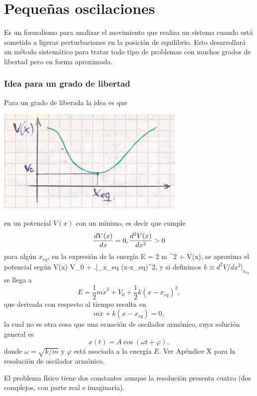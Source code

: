 \documentclass[10pt,oneside]{CBFT_book}
\begin{document}
\chapter{Pequeñas oscilaciones}

Es un formalismo para analizar el movimiento que realiza un sistema cuando está sometido a
ligeras perturbaciones en la posición de equilibrio.
Esto desarrollará un método sistemático para tratar todo tipo de problemas con muchos grados
de libertad pero en forma aproximada.

\subsection{Idea para un grado de libertad}

Para un grado de liberada la idea es que 

\includegraphics[scale=0.5]{images/fig_mc_oscil_1.jpg}

en un potencial $V(x)$ con un mínimo, es decir que cumple 
\[
	\dtot{V(x)}{x} = 0 ,\dtot[2]{V(x)}{x} > 0
\]
para algún $x_{eq}$, en la expresión de la energía
\be
	E =  2 m ^2 + V(x),
	\label{energia_1d}
\ee
se aproxima el potencial según
\be
	V(x) \approx V_0 +  \left.\right|_{x_{eq}} (x-x_{eq})^2,
	\label{potencial_aproximado}
\ee
y si definimos $ k \equiv d^2V/dx^2|_{x_{eq}} $ se llega a 
\[
	E = \frac 1 2 m \dot{x}^2 + V_0 + \frac{1}{2} k (x-x_{eq})^2, 
\]
que derivada con respecto al tiempo resulta en 
\[
	m\ddot{x} + k (x-x_{eq}) = 0,
\]
la cual no es otra cosa que una ecuación de oscilador armónico, cuya solución general es
\[
	x(t) = A \cos (\omega t + \varphi ),
\]
donde $ \omega =  \sqrt{ k / m } $ y $ \varphi $ está asociada a la energía $E$. Ver Apéndice X para la resolución
de oscilador armónico.

El problema físico tiene dos constantes aunque la resolución presenta cuatro (dos complejos, con parte real e imaginaria).
\end{document}
